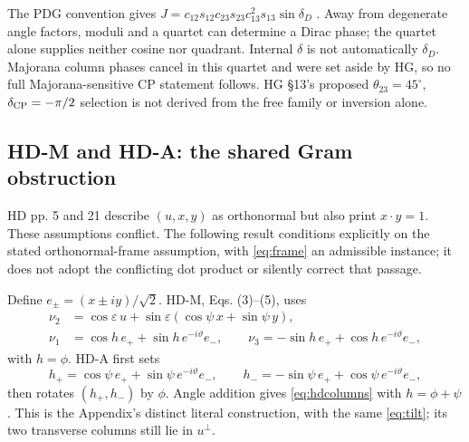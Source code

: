 \documentclass[11pt,a4paper]{article}
\numberwithin{equation}{section}
\begin{document}
The PDG convention gives $J=c_{12}s_{12}c_{23}s_{23}c_{13}^2s_{13}\sin\delta_D$ \cite[Eq. 14.34 and \S14.7.3]{pdg}. Away from degenerate angle factors, moduli and a quartet can determine a Dirac phase; the quartet alone supplies neither cosine nor quadrant. Internal $\delta$ is not automatically $\delta_D$. Majorana column phases cancel in this quartet and were set aside by HG, so no full Majorana-sensitive CP statement follows. HG \S13's proposed $\theta_{23}=45^\circ$, $\delta_{\rm CP}=-\pi/2$ selection is not derived from the free family or inversion alone.

\subsection{HD-M and HD-A: the shared Gram obstruction}\label{sec:gram}
HD pp. 5 and 21 describe $(u,x,y)$ as orthonormal but also print $x\mathbin{\cdot}y=1$. These assumptions conflict. The following result conditions explicitly on the stated orthonormal-frame assumption, with \eqref{eq:frame} an admissible instance; it does not adopt the conflicting dot product or silently correct that passage.

Define $e_\pm=(x\pm iy)/\sqrt2$. HD-M, Eqs. (3)--(5), uses
\begin{align}
 \nu_2&=\cos\varepsilon\,u+\sin\varepsilon(\cos\psi\,x+\sin\psi\,y),\label{eq:tilt}\\
 \nu_1&=\cos h\,e_++\sin h\,e^{-i\vartheta}e_-,\qquad
 \nu_3=-\sin h\,e_++\cos h\,e^{-i\vartheta}e_-,\label{eq:hdcolumns}
\end{align}
with $h=\phi$. HD-A first sets
\begin{equation}
 h_+=\cos\psi\,e_++\sin\psi\,e^{-i\vartheta}e_-,\qquad
 h_-=-\sin\psi\,e_++\cos\psi\,e^{-i\vartheta}e_-,
\end{equation}
then rotates $(h_+,h_-)$ by $\phi$. Angle addition gives \eqref{eq:hdcolumns} with $h=\phi+\psi$. This is the Appendix's distinct literal construction, with the same \eqref{eq:tilt}; its two transverse columns still lie in $u^\perp$.
\end{document}
